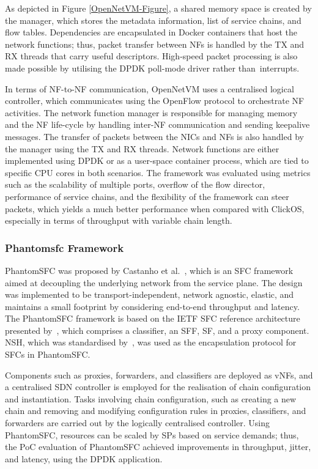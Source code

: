 \documentclass[futureinternet,review,accept,pdftex,moreauthors]{Definitions/mdpi}
\begin{document}


As depicted in Figure \ref{OpenNetVM-Figure}, a shared memory space is created by the manager, which stores the metadata information, list of service chains, and flow tables. Dependencies are encapsulated in Docker containers that host the network functions; thus, packet transfer between NFs is handled by the TX and RX threads that carry useful descriptors. High-speed packet processing is also made possible by utilising the DPDK poll-mode driver rather than~interrupts. 

In terms of NF-to-NF communication, OpenNetVM  uses a centralised logical controller, which communicates using the OpenFlow protocol to orchestrate NF activities. The network function manager is responsible for managing memory and the NF life-cycle by handling inter-NF communication and sending keepalive messages. The transfer of packets between the NICs and NFs is also handled by the manager using the TX and RX threads. Network functions are either implemented using DPDK or as a user-space container process, which are tied to specific CPU cores in both scenarios. The framework was evaluated using metrics such as the scalability of multiple ports, overflow of the flow director, performance of service chains, and the flexibility of the framework can steer packets, which yields a much better performance when compared with ClickOS, especially in terms of throughput with variable chain length.

\subsubsection{Phantomsfc Framework}
\label{PhantomSFC}
PhantomSFC was proposed by Castanho {et al.}~\cite{castanho2018phantomsfc}, which is an SFC framework aimed at decoupling the underlying network from the service plane. The design was implemented to be transport-independent, network agnostic, elastic, and maintains a small footprint by considering end-to-end throughput and latency. The PhantomSFC framework is based on the IETF SFC reference architecture presented by~\cite{halpern2015service}, which comprises a classifier, an SFF, SF, and a proxy component. NSH, which was standardised by~\cite{quinn2018network}, was used as the encapsulation protocol for SFCs in PhantomSFC.

Components such as proxies, forwarders, and classifiers are deployed as vNFs, and a centralised SDN controller is employed for the realisation of chain configuration and instantiation. Tasks involving chain configuration, such as creating a new chain and removing and modifying configuration rules in proxies, classifiers, and forwarders are carried out by the logically centralised controller. Using PhantomSFC, resources can be scaled by SPs based on service demands; thus, the PoC evaluation of PhantomSFC achieved improvements in throughput, jitter, and latency, using the DPDK application.
\end{document}
